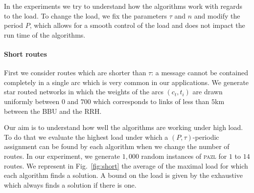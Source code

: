 \documentclass[10pt, conference, letterpaper]{IEEEtran}
\newcommand\pazl{\textsc{pazl}\xspace}
\begin{document}
       In the experiments we try to understand how the algorithms work with regards to the load. To change the load, we fix the parameters $\tau$ and $n$ and modify the period $P$, which allows for a smooth control of the load and does not impact the run time of the algorithms.
      

      \paragraph{Short routes}
      
      First we consider routes which are shorter than $\tau$: a message cannot be contained completely in a single arc which is very common in our applications. We generate star routed networks in which the weights of the arcs $(c_t,t_i)$ are drawn uniformly between $0$ and $700$ which corresponds to links of less than $5$km between the BBU and the RRH. 
      
      Our aim is to understand how well the algorithms are working under high load. To do that we evaluate the highest load 
      under which a $(P,\tau)$-periodic assignment can be found by each algorithm when we change the number of routes. 
      In our experiment, we generate $1,000$ random instances of \pazl for $1$ to $14$ routes. We represent in Fig.~\ref{fig:short} the average of the maximal load for which each algorithm finds a solution. A bound on the load is given by the exhaustive which always finds a solution if there is one. 
      
\end{document}
